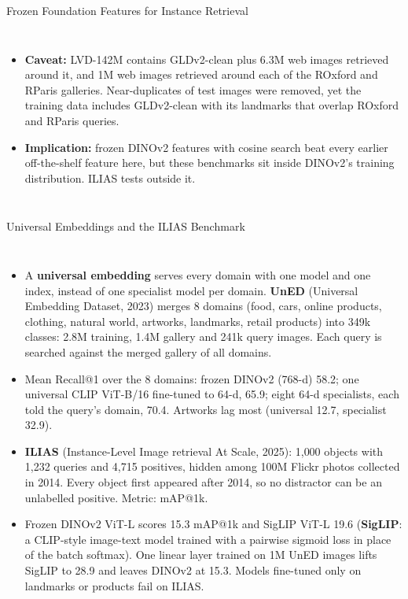 \begin{frame}{Frozen Foundation Features for Instance Retrieval}
\begin{columns}[T,onlytextwidth]
\begin{itemize}
        \item \textbf{Caveat:} LVD-142M contains GLDv2-clean plus 6.3M web images retrieved around it, and 1M web images retrieved around each of the ROxford and RParis galleries. Near-duplicates of test images were removed, yet the training data includes GLDv2-clean with its landmarks that overlap ROxford and RParis queries.
        \item \textbf{Implication:} frozen DINOv2 features with cosine search beat every earlier off-the-shelf feature here, but these benchmarks sit inside DINOv2's training distribution. ILIAS tests outside it.
      \end{itemize}
  \end{columns}
\end{frame}

\begin{frame}{Universal Embeddings and the ILIAS Benchmark}
  \begin{columns}[T,onlytextwidth]
      \begin{itemize}\scriptsize\itemsep0.35em
        \item A \textbf{universal embedding} serves every domain with one model and one index, instead of one specialist model per domain. \textbf{UnED} (Universal Embedding Dataset, 2023) merges 8 domains (food, cars, online products, clothing, natural world, artworks, landmarks, retail products) into 349k classes: 2.8M training, 1.4M gallery and 241k query images. Each query is searched against the merged gallery of all domains.
        \item Mean Recall@1 over the 8 domains: frozen DINOv2 (768-d) 58.2; one universal CLIP ViT-B/16 fine-tuned to 64-d, 65.9; eight 64-d specialists, each told the query's domain, 70.4. Artworks lag most (universal 12.7, specialist 32.9).
        \item \textbf{ILIAS} (Instance-Level Image retrieval At Scale, 2025): 1{,}000 objects with 1{,}232 queries and 4{,}715 positives, hidden among 100M Flickr photos collected in 2014. Every object first appeared after 2014, so no distractor can be an unlabelled positive. Metric: mAP@1k.
        \item Frozen DINOv2 ViT-L scores 15.3 mAP@1k and SigLIP ViT-L 19.6 (\textbf{SigLIP}: a CLIP-style image-text model trained with a pairwise sigmoid loss in place of the batch softmax). One linear layer trained on 1M UnED images lifts SigLIP to 28.9 and leaves DINOv2 at 15.3. Models fine-tuned only on landmarks or products fail on ILIAS.
      \end{itemize}

\end{columns}
\end{frame}
